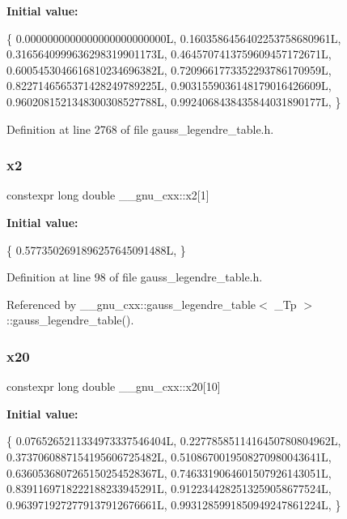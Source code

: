 {\bfseries Initial value\+:}
\begin{DoxyCode}
\{
    0.0000000000000000000000000L,
    0.1603586456402253758680961L,
    0.3165640999636298319901173L,
    0.4645707413759609457172671L,
    0.6005453046616810234696382L,
    0.7209661773352293786170959L,
    0.8227146565371428249789225L,
    0.9031559036148179016426609L,
    0.9602081521348300308527788L,
    0.9924068438435844031890177L,
  \}
\end{DoxyCode}


Definition at line 2768 of file gauss\+\_\+legendre\+\_\+table.\+h.

\mbox{\label{namespace____gnu__cxx_a0001a0bc4eebf0b8d542f860d9d629ca}} 
\subsubsection{\texorpdfstring{x2}{x2}}
{\footnotesize\ttfamily constexpr long double \+\_\+\+\_\+gnu\+\_\+cxx\+::x2\mbox{[}1\mbox{]}}

{\bfseries Initial value\+:}
\begin{DoxyCode}
\{
    0.5773502691896257645091488L,
  \}
\end{DoxyCode}


Definition at line 98 of file gauss\+\_\+legendre\+\_\+table.\+h.



Referenced by \+\_\+\+\_\+gnu\+\_\+cxx\+::gauss\+\_\+legendre\+\_\+table$<$ \+\_\+\+Tp $>$\+::gauss\+\_\+legendre\+\_\+table().

\mbox{\label{namespace____gnu__cxx_ab62325d60ce77ad6bb9c699a3d1531fd}} 
\subsubsection{\texorpdfstring{x20}{x20}}
{\footnotesize\ttfamily constexpr long double \+\_\+\+\_\+gnu\+\_\+cxx\+::x20\mbox{[}10\mbox{]}}

{\bfseries Initial value\+:}
\begin{DoxyCode}
\{
    0.0765265211334973337546404L,
    0.2277858511416450780804962L,
    0.3737060887154195606725482L,
    0.5108670019508270980043641L,
    0.6360536807265150254528367L,
    0.7463319064601507926143051L,
    0.8391169718222188233945291L,
    0.9122344282513259058677524L,
    0.9639719272779137912676661L,
    0.9931285991850949247861224L,
  \}
\end{DoxyCode}


